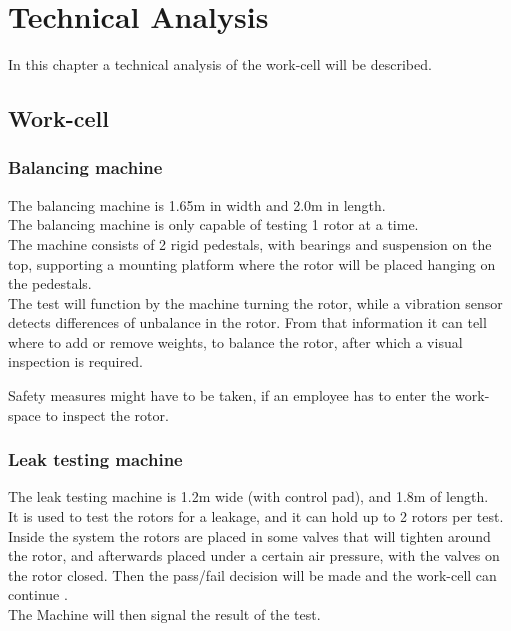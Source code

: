  \chapter{Technical Analysis} \label{TechAnalysis}
 
 In this chapter a technical analysis of the work-cell will be described.\\
 
 \section{Work-cell}
 
 \subsection{Balancing machine}
 
 The balancing machine is 1.65m in width and 2.0m in length.\\
 The balancing machine is only capable of testing 1 rotor at a time.\\
 The machine consists of 2 rigid pedestals, with bearings and suspension on the top, supporting a mounting platform where the rotor will be placed hanging on the pedestals.\\

The test will function by the machine turning the rotor, while a vibration sensor detects differences of unbalance in the rotor. From that information it can tell where to add or remove weights, to balance the rotor, after which a visual inspection is required.

Safety measures might have to be taken, if an employee has to enter the work-space to inspect the rotor.
 
 \subsection{Leak testing machine}
 
 The leak testing machine is 1.2m wide (with control pad), and 1.8m of length.\\ 
 It is used to test the rotors for a leakage, and it can hold up to 2 rotors per test.\\
 Inside the system the rotors are placed in some valves that will tighten around the rotor, and afterwards placed under a certain air pressure, with the valves on the rotor closed. Then the pass/fail decision will be made and the work-cell can continue \cite{LEAK}.\\
 The Machine will then signal the result of the test.\\
 
